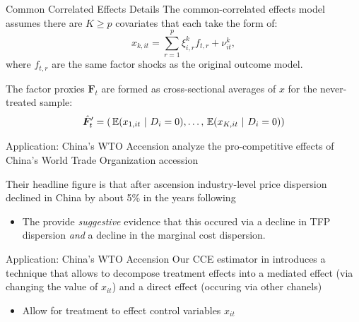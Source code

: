 \documentclass[aspectratio=169,t,11pt]{beamer}
\begin{document}
\begin{frame}{Common Correlated Effects Details}\label{slide:appendixcce_details}
  The common-correlated effects model assumes there are $K \geq p$ covariates that each take the form of:
  $$
    x_{k,it} = \sum_{r = 1}^p \xi^k_{i,r} f_{t, r} + \nu^k_{it},
  $$
  where $f_{t,r}$ are the same factor shocks as the original outcome model. 

  \medskip
  The factor proxies $\bm{F}_t$ are formed as cross-sectional averages of $x$ for the never-treated sample:
  $$
    \hat{\bm{F}}_t' = \left( \expec{x_{1,it}}{D_i = 0}, \dots, \expec{x_{K,it}}{D_i = 0} \right)
  $$

\end{frame}

\begin{frame}{Application: China's WTO Accension}\label{slide:appendix-wto_application}
  \citet{lu2015trade} analyze the pro-competitive effects of China's World Trade Organization accession

  \bigskip
  Their headline figure is that after ascension industry-level price dispersion declined in China by about 5\% in the years following
  \begin{itemize}
    \item The provide \emph{suggestive} evidence that this occured via a decline in TFP dispersion \emph{and} a decline in the marginal cost dispersion.
  \end{itemize}

\end{frame}

\begin{frame}{Application: China's WTO Accension}
  Our CCE estimator in \citet{Brown_Butts_Westerlund_2023} introduces a technique that allows to decompose treatment effects into a mediated effect (via changing the value of $x_{it}$) and a direct effect (occuring via other chanels)
  \begin{itemize}
    \item Allow for treatment to effect control variables $x_{it}$ 
  \end{itemize}

\end{frame}
\end{document}
